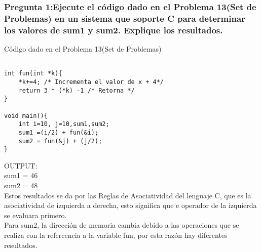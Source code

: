 \subsubsection{Pregunta 1:Ejecute el código dado en el Problema 13(Set de Problemas) en un sistema que soporte C para determinar los valores de sum1 y sum2. Explique los resultados.}
\lstset{language = C}  %
Código dado en el Problema 13(Set de Problemas)
\begin{lstlisting}[frame = single] %Comienzo del Código

int fun(int *k){
	*k+=4; /* Incrementa el valor de x + 4*/
	return 3 * (*k) -1 /* Retorna */
}

void main(){
	int i=10, j=10,sum1,sum2;
	sum1 =(i/2) + fun(&i);
	sum2 = fun(&j) + (j/2);
}
\end{lstlisting}
OUTPUT:\\
	sum1 = 46\\
	sum2 = 48\\
	Estos resultados se da por las Reglas de Asociatividad del lenguaje C, 
	que es la asociatividad de izquierda a derecha, esto significa que e operador de la izquierda se evaluara primero.\\
	
	Para sum2, la dirección de memoria cambia debido a las operaciones que se realiza
	con la refercencia a la variable fun, por esta razón hay diferentes resultados.\\



